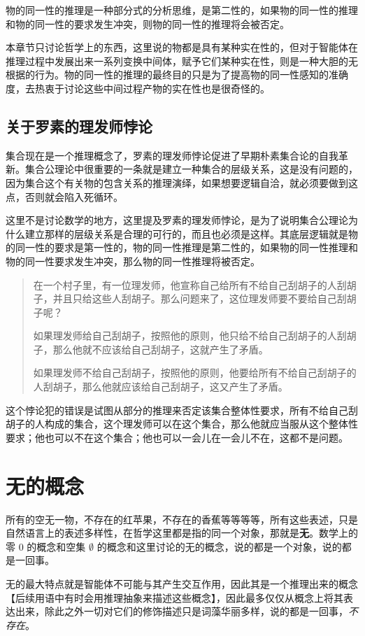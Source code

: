 \documentclass[12pt,oneside]{book}
\begin{document}
物的同一性的推理是一种部分式的分析思维，是第二性的，如果物的同一性的推理和物的同一性的要求发生冲突，则物的同一性的推理将会被否定。

本章节只讨论哲学上的东西，这里说的物都是具有某种实在性的，但对于智能体在推理过程中发展出来一系列变换中间体，赋予它们某种实在性，则是一种大胆的无根据的行为。物的同一性的推理的最终目的只是为了提高物的同一性感知的准确度，去热衷于讨论这些中间过程产物的实在性也是很奇怪的。

\subsection{关于罗素的理发师悖论}
集合现在是一个推理概念了，罗素的理发师悖论促进了早期朴素集合论的自我革新。集合公理论中很重要的一条就是建立一种集合的层级关系，这是没有问题的，因为集合这个有关物的包含关系的推理演绎，如果想要逻辑自洽，就必须要做到这点，否则就会陷入死循环。

这里不是讨论数学的地方，这里提及罗素的理发师悖论，是为了说明集合公理论为什么建立那样的层级关系是合理的可行的，而且也必须是这样。其底层逻辑就是物的同一性的要求是第一性的，物的同一性推理是第二性的，如果物的同一性推理和物的同一性要求发生冲突，那么物的同一性推理将被否定。

\begin{quote}
在一个村子里，有一位理发师，他宣称自己给所有不给自己刮胡子的人刮胡子，并且只给这些人刮胡子。那么问题来了，这位理发师要不要给自己刮胡子呢？

如果理发师给自己刮胡子，按照他的原则，他只给不给自己刮胡子的人刮胡子，那么他就不应该给自己刮胡子，这就产生了矛盾。

如果理发师不给自己刮胡子，按照他的原则，他要给所有不给自己刮胡子的人刮胡子，那么他就应该给自己刮胡子，这又产生了矛盾。
\end{quote}

这个悖论犯的错误是试图从部分的推理来否定该集合整体性要求，所有不给自己刮胡子的人构成的集合，这个理发师可以在这个集合，那么他就应当服从这个整体性要求；他也可以不在这个集合；他也可以一会儿在一会儿不在，这都不是问题。

\section{无的概念}
所有的空无一物，不存在的红苹果，不存在的香蕉等等等等，所有这些表述，只是自然语言上的表述多样性，在哲学这里都是指的同一个对象，那就是\textbf{无}。数学上的零 $0$ 的概念和空集 $\emptyset$ 的概念和这里讨论的无的概念，说的都是一个对象，说的都是一回事。

无的最大特点就是智能体不可能与其产生交互作用，因此其是一个推理出来的概念【后续用语中有时会用推理抽象来描述这些概念】，因此最多仅仅从概念上将其表达出来，除此之外一切对它们的修饰描述只是词藻华丽多样，说的都是一回事，\textit{不存在}。
\end{document}

